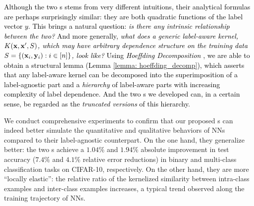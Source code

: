 \textcolor{black}{Although the two \lantk s stems from very different intuitions, their analytical formulas are perhaps surprisingly similar: they are both quadratic functions of the label vector $y$. This brings a natural question: \emph{is there any intrinsic relationship between the two?} And more generally, \emph{what does a generic label-aware kernel, $K({\mathbf{x}}, {\mathbf{x}}', S)$, which may have arbitrary dependence structure on the training data $S = \{({\mathbf{x}}_i, {\mathbf{y}}_i): i\in[n]\}$, look like?}
Using \emph{Hoeffding Decomposition} \citep{hoeffding1948class}, we are able to obtain a structural lemma (Lemma \ref{lemma: hoeffding_decomp}), which asserts that any label-aware kernel can be decomposed into the superimposition of a label-agnostic part and a \emph{hierarchy} of label-aware parts with increasing complexity of label dependence. And the two \lantk s we developed can, in a certain sense, be regarded as the \emph{truncated versions} of this hierarchy. 
} 



We conduct comprehensive experiments to confirm that our proposed \lantk s can indeed better simulate the quantitative and qualitative behaviors of NNs compared to their label-agnostic counterpart. On the one hand, they generalize better: the two \lantk s achieve a $1.04\%$ and $1.94\%$ absolute improvement in test accuracy ($7.4\%$ and $4.1\%$ relative error reductions) in binary and multi-class classification tasks on CIFAR-10, respectively. On the other hand, they are more ``locally elastic'': the relative ratio of the kernelized similarity between intra-class examples and inter-class examples increases, a typical trend observed along the training trajectory of NNs. 


